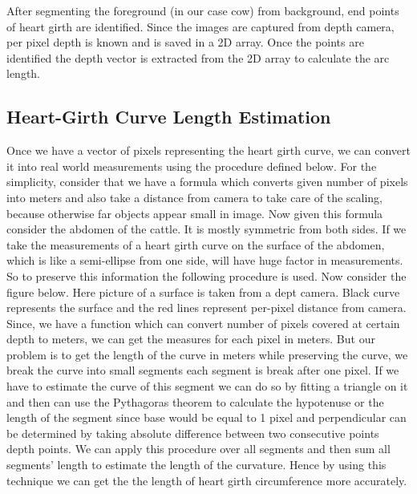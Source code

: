 \documentclass{article}
\begin{document}
After segmenting the foreground (in our case cow) from background, end points of heart girth are identified. Since the images are captured from depth camera, per pixel depth is known and is saved in a 2D array. Once the points are identified the depth vector is extracted from the 2D array to calculate the arc length. 

\subsection{Heart-Girth Curve Length Estimation}

Once we have a vector of pixels representing the heart girth curve, we can convert it into real world measurements using the procedure defined below. For the simplicity, consider that we have a formula which converts given number of pixels into meters and also take a distance from camera to
take care of the scaling, because otherwise far objects appear small in image. Now
given this formula consider the abdomen of the cattle. It is mostly symmetric from
both sides. If we take the measurements of a heart girth curve on
the surface of the abdomen, which is like a semi-ellipse from one side, will have huge
factor in measurements. So to preserve this information the following procedure is
used.
Now consider the figure below. Here picture of a surface is taken from a dept camera.
Black curve represents the surface and the red lines represent per-pixel distance
from camera. Since, we have a function which can convert number
of pixels covered at certain depth to meters, we can get the measures for each pixel
in meters. But our problem is to get the length of the curve in meters
while preserving the curve, we break the curve into small segments each segment is
break after one pixel. If we have to estimate the curve of this segment we can do so
by fitting a triangle on it and then can use the Pythagoras theorem
to calculate the hypotenuse or the length of the segment since base would be equal to 1 pixel and perpendicular can be determined by taking absolute difference between two consecutive points depth points. We can apply this procedure over all segments and then sum all segments’
length to estimate the length of the curvature. Hence by using this technique we can
get the the length of heart girth circumference more accurately.
\end{document}
